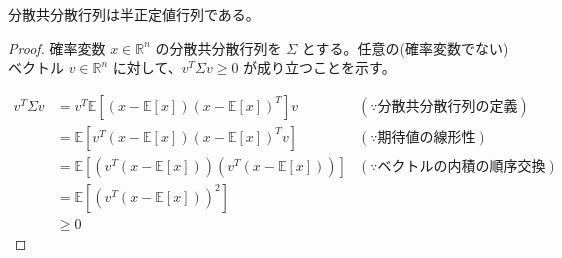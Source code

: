 \begin{lemma}
    \label{lm:cov_semi_definite}
    分散共分散行列は半正定値行列である。
\end{lemma}
\begin{proof}
    確率変数 $x\in\mathbb{R}^n$ の分散共分散行列を $\Sigma$ とする。任意の(確率変数でない)ベクトル $v\in\mathbb{R}^n$ に対して、$v^T\Sigma v \ge 0$ が成り立つことを示す。
    
    \begin{equation}
        \begin{aligned}
            v^T\Sigma v & = v^T \mathbb{E}[(x - \mathbb{E}[x])(x - \mathbb{E}[x])^T] v   & (\because 分散共分散行列の定義)   \\
                        & = \mathbb{E}[v^T(x - \mathbb{E}[x])(x - \mathbb{E}[x])^T v]    & (\because 期待値の線形性)      \\
                        & = \mathbb{E}[(v^T(x - \mathbb{E}[x]))(v^T(x - \mathbb{E}[x]))] & (\because ベクトルの内積の順序交換) \\
                        & = \mathbb{E}[(v^T(x - \mathbb{E}[x]))^2]                                                 \\
                        & \ge 0
        \end{aligned}
    \end{equation}
\end{proof}

